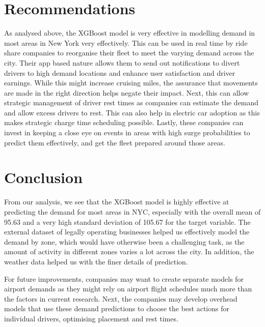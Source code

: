 \documentclass[11pt]{article}
\begin{document}
\section{Recommendations}
As analysed above, the XGBoost model is very effective in modelling demand in most areas in New York very effectively. This can be used in real time by ride share companies to reorganise their fleet to meet the varying demand across the city. Their app based nature allows them to send out notifications to divert drivers to high demand locations and enhance user satisfaction and driver earnings. While this might increase cruising miles, the assurance that movements are made in the right direction helps negate their impact. Next, this can allow strategic management of driver rest times as companies can estimate the demand and allow excess drivers to rest. This can also help in electric car adoption as this makes strategic charge time scheduling possible. Lastly, these companies can invest in keeping a close eye on events in areas with high surge probabilities to predict them effectively, and get the fleet prepared around those areas.

\section{Conclusion}
From our analysis, we see that the XGBoost model is highly effective at predicting the demand for most areas in NYC, especially with the overall mean of 95.63 and a very high standard deviation of 105.67 for the target variable. The external dataset of legally operating businesses helped us effectively model the demand by zone, which would have otherwise been a challenging task, as the amount of activity in different zones varies a lot across the city. In addition, the weather data helped us with the finer details of prediction.

For future improvements, companies may want to create separate models for airport demands as they might rely on airport flight schedules much more than the factors in current research. Next, the companies may develop overhead models that use these demand predictions to choose the best actions for individual drivers, optimising placement and rest times.


\clearpage

\printbibliography
\end{document}
